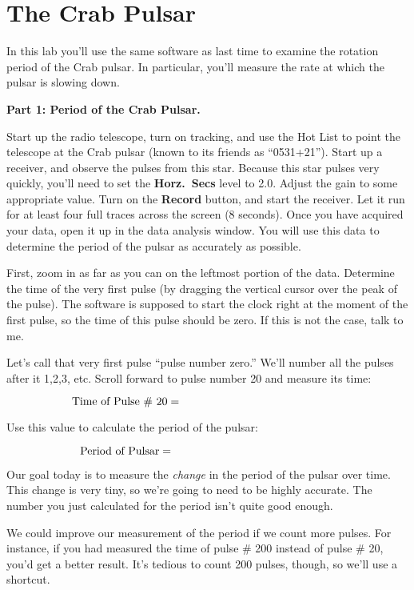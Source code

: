 \chapter{The Crab Pulsar}


In this lab you'll use the same software as last time to examine the 
rotation period of the Crab pulsar.  In particular, you'll measure the
rate at which the pulsar is slowing down.
\bigskip\bigskip

{\bf Part 1: Period of the Crab Pulsar.}

Start up the radio telescope, turn on tracking, and use the Hot List to
point the telescope at the Crab pulsar (known to its friends as ``0531+21'').
Start up a receiver, and observe the pulses from this star.  Because this star
pulses very quickly, you'll need to set the {\bf Horz.\ Secs} level to 2.0.
Adjust the gain to some appropriate value.  Turn on the {\bf Record} button,
and start the receiver.  Let it run for at least four full traces across
the screen (8 seconds).  Once you have acquired your data, open it up
in the data analysis window.  You will use this data to determine the
period of the pulsar as accurately as possible.

First, zoom in as far as you can on the leftmost portion of the data.
Determine the time of the very first pulse (by dragging the vertical
cursor over the peak of the pulse).  The software is supposed to start
the clock right at the moment of the first pulse, so the time of this pulse
should be zero.  If this is not the case, talk to me.

Let's call that very first pulse ``pulse number zero.''  We'll
number all the pulses after it 1,2,3, etc.
Scroll forward to pulse number 20 and measure its time:

\medskip
$$
\mbox{Time of Pulse \# 20}=\hbox to 2in{}
$$
\medskip

Use this value to calculate the period of the pulsar:

\medskip
$$
\mbox{Period of Pulsar}=\hbox to 2in{}
$$
\medskip

Our goal today is to measure the {\it change} in the period
of the pulsar over time.  This change is very tiny, so we're going to
need to be highly accurate.  The number you just calculated for the period
isn't quite good enough.  

We could improve our measurement of the period if we count more pulses.
For instance, if you had measured the time of pulse \# 200 instead
of pulse \# 20, you'd get a better result.  It's tedious to count
200 pulses, though, so we'll use a shortcut.

